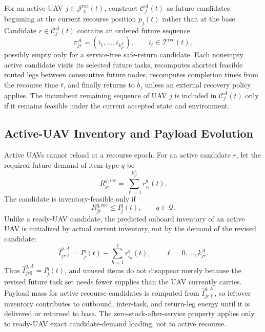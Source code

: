 \documentclass[conference]{IEEEtran}
\begin{document}
For an active UAV $j\in\mathcal J_A^{\mathrm{rec}}(t)$, construct $\mathcal C_j^A(t)$ as future candidates beginning at the current recourse position $p_j(t)$ rather than at the base. Candidate $r\in\mathcal C_j^A(t)$ contains an ordered future sequence
\begin{equation}
\pi_{jr}^{A}=(i_1,\ldots,i_{k_{jr}^{A}}),\qquad
i_\ell\in\mathcal T^{\mathrm{rec}}(t),
\end{equation}
possibly empty only for a service-free safe-return candidate. Each nonempty active candidate visits its selected future tasks, recomputes shortest feasible routed legs between consecutive future nodes, recomputes completion times from the recourse time $t$, and finally returns to $b_j$ unless an external recovery policy applies. The incumbent remaining sequence of UAV $j$ is included in $\mathcal C_j^A(t)$ only if it remains feasible under the current accepted state and environment.

\subsection{Active-UAV Inventory and Payload Evolution}
Active UAVs cannot reload at a recourse epoch. For an active candidate $r$, let the required future demand of item type $q$ be
\begin{equation}
R_{jr}^{q,\mathrm{rec}}=\sum_{\ell=1}^{k_{jr}^{A}}r_{i_\ell}^q(t).
\end{equation}
The candidate is inventory-feasible only if
\begin{equation}
R_{jr}^{q,\mathrm{rec}}\leq I_j^q(t),\qquad q\in\mathcal Q.
\end{equation}
Unlike a ready-UAV candidate, the predicted onboard inventory of an active UAV is initialized by actual current inventory, not by the demand of the revised candidate:
\begin{equation}
\widehat I_{jr\ell}^{q,A}=I_j^q(t)-\sum_{h=1}^{\ell}r_{i_h}^q(t),
\qquad \ell=0,\ldots,k_{jr}^{A}.
\end{equation}
Thus $\widehat I_{jr0}^{q,A}=I_j^q(t)$, and unused items do not disappear merely because the revised future task set needs fewer supplies than the UAV currently carries. Payload mass for active recourse candidates is computed from $\widehat I_{jr\ell}^{q,A}$, so leftover inventory contributes to outbound, inter-task, and return-leg energy until it is delivered or returned to base. The zero-stock-after-service property applies only to ready-UAV exact candidate-demand loading, not to active recourse.
\end{document}
